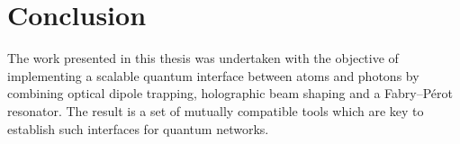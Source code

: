 \documentclass[../Thesis-IJspeert.tex]{subfiles}
\begin{document}
\graphicspath{ {Conclusion/figs/} }

\chapter{Conclusion}
\label{chap:Conclusion}
The work presented in this thesis was undertaken with the objective of implementing a scalable quantum interface between atoms and photons by combining optical dipole trapping, holographic beam shaping and a Fabry--Pérot resonator. The result is a set of mutually compatible tools which are key to establish such interfaces for quantum networks.
\end{document}
